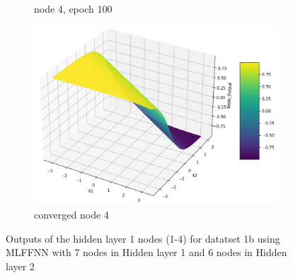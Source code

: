 \documentclass[11pt]{article}
\begin{document}
\begin{figure}[h]
\begin{subfigure}[b]{0.18\textwidth}
	\caption{node 4, epoch 100}
	\label{fig:fig2.1.4.19}
	\end{subfigure}
	\begin{subfigure}[b]{0.18\textwidth}
	\centering
	\includegraphics[scale=0.14]{hidden1_n4_c.jpg}
	\caption{converged node 4}
	\label{fig:fig2.1.4.20}
	\end{subfigure}
\caption{Outputs of the hidden layer 1 nodes (1-4) for datatset 1b using MLFFNN with 7 nodes in Hidden layer 1 and 6 nodes in Hidden layer 2}
\label{fig:fig2.1.4}
\end{figure}
\end{document}
